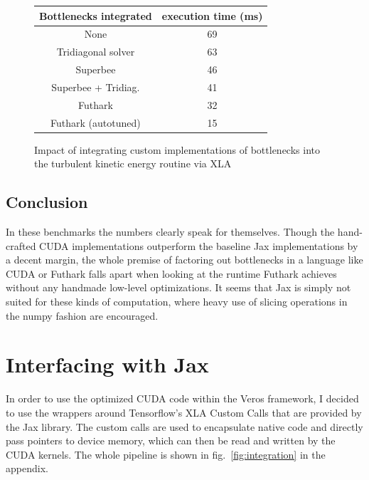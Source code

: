 \documentclass[a4paper,oneside]{memoir}
\begin{document}
\begin{figure}
    \begin{center}
        \begin{tabular}{|c||c|}
        
        \hline
        Bottlenecks integrated &  execution time (ms) \\
        \hline
        \hline
        None &  69 \\
        \hline
        Tridiagonal solver &  63 \\
        \hline
        Superbee & 46 \\
        \hline
        Superbee + Tridiag. & 41 \\
        \hline
        \hline
        Futhark & 32 \\
        \hline
        Futhark (autotuned) & 15 \\
        \hline
        \end{tabular}
    \end{center}
    \caption{Impact of integrating custom implementations of bottlenecks into the turbulent kinetic energy routine via XLA}
    \label{fig:tke_bench}
\end{figure}

\subsection{Conclusion}
In these benchmarks the numbers clearly speak for themselves. Though the hand-crafted CUDA implementations outperform the baseline Jax implementations by a decent margin, the whole premise of factoring out bottlenecks in a language like CUDA or Futhark falls apart when looking at the runtime Futhark achieves without any handmade low-level optimizations. It seems that Jax is simply not suited for these kinds of computation, where heavy use of slicing operations in the numpy fashion are encouraged.
\section{Interfacing with Jax}
\label{sec:integrate}
In order to use the optimized CUDA code within the Veros framework, I decided to use the wrappers around Tensorflow's \cite{tensorflow} XLA Custom Calls that are provided by the Jax library. The custom calls are used to encapsulate native code and directly pass pointers to device memory, which can then be read and written by the CUDA kernels. The whole pipeline is shown in fig.~\ref{fig:integration} in the appendix.
\end{document}
